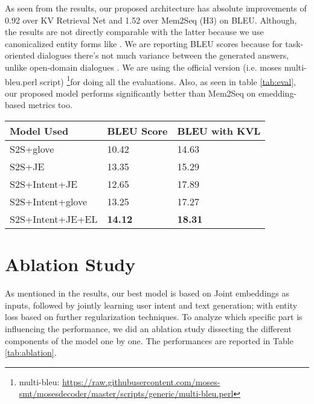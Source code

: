 \documentclass[runningheads]{llncs}
\begin{document}
As seen from the results, our proposed architecture has absolute improvements of 0.92 over KV Retrieval Net and 1.52 over Mem2Seq (H3) on BLEU. Although, the results are not directly comparable with the latter because we use canonicalized entity forms like \cite{eric-manning:2017:SIGDIAL}. We are reporting BLEU scores because for task-oriented dialogues there's not much variance between the generated answers, unlike open-domain dialogues \cite{liu2016not}. We are using the official version (i.e. moses  multi-bleu.perl script)
\footnote{\raggedright multi-bleu: \url{https://raw.githubusercontent.com/moses-smt/mosesdecoder/master/scripts/generic/multi-bleu.perl} }for doing all the evaluations. Also, as seen in table \ref{tab:eval}, our proposed model performs significantly better than Mem2Seq on emedding-based metrics too.



\begin{table*}[ht]
    \centering
    \caption{Ablation Study.}
    \begin{tabular}{l|l|l}
        \toprule
        \textbf{Model Used} &  \textbf{BLEU Score} & \textbf{BLEU with KVL} \\
        \hline
S2S+glove &  10.42 & 14.63 \\
        S2S+JE &  13.35 & 15.29 \\
        S2S+Intent+JE & 12.65 & 17.89  \\
        S2S+Intent+glove &  13.25 & 17.27 \\
        S2S+Intent+JE+EL &  \textbf{14.12} & \textbf{18.31} \\

        \bottomrule
    \end{tabular}
     \vspace{0.1cm}
    \label{tab:ablation}
\end{table*}




\section{Ablation Study}

As mentioned in the results, our best model is based on Joint embeddings as inputs, followed by jointly learning user intent and text generation; with entity loss based on further regularization techniques. To analyze which specific part is influencing the performance, we did an ablation study dissecting the different components of the model one by one.
The performances are reported in Table \ref{tab:ablation}.
\end{document}
